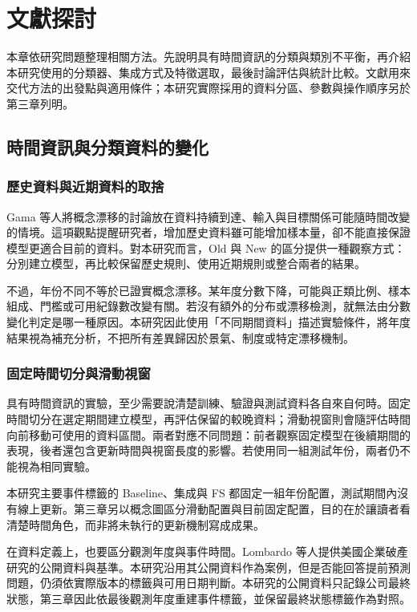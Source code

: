 \chapter{文獻探討}\label{chap:literature}
\begingroup
\setlength{\emergencystretch}{2em}

本章依研究問題整理相關方法。先說明具有時間資訊的分類與類別不平衡，再介紹本研究使用的分類器、集成方式及特徵選取，最後討論評估與統計比較。文獻用來交代方法的出發點與適用條件；本研究實際採用的資料分區、參數與操作順序另於第三章列明。

\section{時間資訊與分類資料的變化}

\subsection{歷史資料與近期資料的取捨}

Gama 等人\autocite{gama2014drift}將概念漂移的討論放在資料持續到達、輸入與目標關係可能隨時間改變的情境。這項觀點提醒研究者，增加歷史資料雖可能增加樣本量，卻不能直接保證模型更適合目前的資料。對本研究而言，Old 與 New 的區分提供一種觀察方式：分別建立模型，再比較保留歷史規則、使用近期規則或整合兩者的結果。

不過，年份不同不等於已證實概念漂移。某年度分數下降，可能與正類比例、樣本組成、門檻或可用紀錄數改變有關。若沒有額外的分布或漂移檢測，就無法由分數變化判定是哪一種原因。本研究因此使用「不同期間資料」描述實驗條件，將年度結果視為補充分析，不把所有差異歸因於景氣、制度或特定漂移機制。

\subsection{固定時間切分與滑動視窗}

具有時間資訊的實驗，至少需要說清楚訓練、驗證與測試資料各自來自何時。固定時間切分在選定期間建立模型，再評估保留的較晚資料；滑動視窗則會隨評估時間向前移動可使用的資料區間。兩者對應不同問題：前者觀察固定模型在後續期間的表現，後者還包含更新時間與視窗長度的影響。若使用同一組測試年份，兩者仍不能視為相同實驗。

本研究主要事件標籤的 Baseline、集成與 FS 都固定一組年份配置，測試期間內沒有線上更新。第三章另以概念圖區分滑動配置與目前固定配置，目的在於讓讀者看清楚時間角色，而非將未執行的更新機制寫成成果。

在資料定義上，也要區分觀測年度與事件時間。Lombardo 等人\autocite{lombardo2022bankruptcy}提供美國企業破產研究的公開資料與基準。本研究沿用其公開資料作為案例，但是否能回答提前預測問題，仍須依實際版本的標籤與可用日期判斷。本研究的公開資料只記錄公司最終狀態，第三章因此依最後觀測年度重建事件標籤，並保留最終狀態標籤作為對照。

